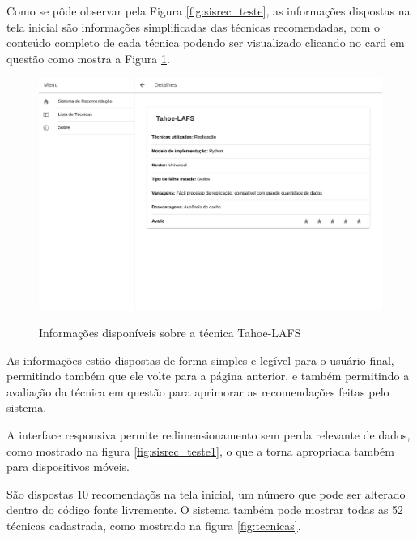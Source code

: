 \documentclass[
	12pt,				%
	oneside,			%
	a4paper,			%
	chapter=TITLE,		%
	english,			%
	french,				%
	spanish,			%
	brazil				%
	]{abntex2}
\begin{document}
Como se pôde observar pela Figura \ref{fig:sisrec_teste}, as informações dispostas na tela inicial são informações simplificadas das técnicas recomendadas, com o conteúdo completo de cada técnica podendo ser visualizado clicando no card em questão como mostra a Figura \ref{fig:sisrec_info}.

\begin{figure}[H]
    \centering
    \caption{Informações disponíveis sobre a técnica Tahoe-LAFS}
    \includegraphics[scale=1.5]{images/sist_recomend2.png}
    \label{fig:sisrec_info}
    \\
\end{figure}

As informações estão dispostas de forma simples e legível para o usuário final, permitindo também que ele volte para a página anterior, e também permitindo a avaliação da técnica em questão para aprimorar as recomendações feitas pelo sistema.

A interface responsiva permite redimensionamento sem perda relevante de dados, como mostrado na figura \ref{fig:sisrec_teste1}, o que a torna apropriada também para dispositivos móveis.

São dispostas 10 recomendaçõs na tela inicial, um número que pode ser alterado dentro do código fonte livremente. O sistema também pode mostrar todas as 52 técnicas cadastrada, como mostrado na figura \ref{fig:tecnicas}.
\end{document}
